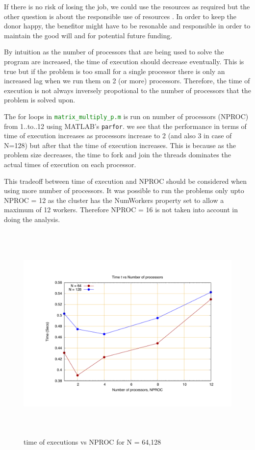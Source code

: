 \documentclass[fleqn,letterpaper,12pt]{report}
\begin{document}
If there is no risk of losing the job, we could use the resources as required but the other question is about the responsible use of resources \cite{cdresources}. In order to keep the donor happy, the benefitor might have to be resonable and responsible in order to maintain the good will and for potential future funding.

\newpage
{}
{}
\problem
By intuition as the number of processors that are being used to solve the program are increased, the time of execution should decrease eventually. This is true but if the problem is too small for a single processor there is only an increased lag when we run them on 2 (or more) processors. Therefore, the time of execution is not always inversely propotional to the number of processors that the problem is solved upon.

The for loops in {\tt\textcolor{Green}{matrix\_multiply\_p.m}} is run on number of processors (NPROC) from 1..to..12 using MATLAB's {\tt parfor}. we see that the performance in terms of time of execution increases as processors increase to 2 (and also 3 in case of N=128) but after that the time of execution increases. This is because as the problem size decreases, the time to fork and join the threads dominates the actual times of execution on each processor. 

This tradeoff between time of execution and NPROC should be considered when using more number of processors. It was possible to run the problems only upto NPROC = 12 as the cluster has the NumWorkers property set to allow a maximum of 12 workers. Therefore NPROC = 16 is not taken into account in doing the analysis.

\begin{figure}[!h]
	\centering
	\includegraphics[height=110mm,width=160mm]{64n128.pdf}
	\caption{time of executions vs NPROC for N = 64,128\label{overflow}}
\end{figure}
\end{document}
